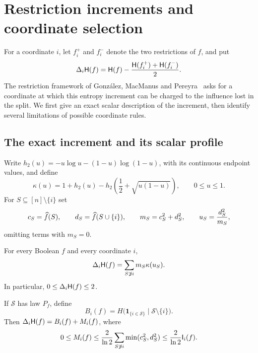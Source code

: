 \section{Restriction increments and coordinate selection}\label{sec:restrictions}

For a coordinate $i$, let $f_i^+$ and $f_i^-$ denote the two restrictions
of $f$, and put
\[
 \Delta_i\mathsf H(f)=\mathsf H(f)-\frac{\mathsf H(f_i^+)+\mathsf H(f_i^-)}2.
\]
The restriction framework of Gonz\'alez, MacManus and
Pereyra~\cite{GMP26} asks for a coordinate at which this entropy
increment can be charged to the influence lost in the split.
We first give an exact scalar description of the increment, then
identify several limitations of possible coordinate rules.

\subsection{The exact increment and its scalar profile}

Write $h_2(u)=-u\log u-(1-u)\log(1-u)$, with its continuous endpoint
values, and define
\begin{equation}\label{eq:kappadef}
 \kappa(u)=1+h_2(u)
 -h_2\!\left(\frac12+\sqrt{u(1-u)}\right),
 \qquad 0\le u\le1.
\end{equation}
For $S\subseteq[n]\setminus\{i\}$ set
\[
 c_S=\widehat{f}(S),\qquad d_S=\widehat{f}(S\cup\{i\}),\qquad
 m_S=c_S^2+d_S^2,\qquad u_S=\frac{d_S^2}{m_S},
\]
omitting terms with $m_S=0$.

\begin{proposition}\label{prop:splitexact}
For every Boolean $f$ and every coordinate $i$,
\begin{equation}\label{eq:splitexact}
 \Delta_i\mathsf H(f)=\sum_{S\not\ni i}m_S\kappa(u_S).
\end{equation}
In particular, $0\le\Delta_i\mathsf H(f)\le2$.

If $\mathcal S$ has law $P_f$, define
\[
 B_i(f)=H\bigl(\mathbf1_{\{i\in\mathcal S\}}\mid
                         \mathcal S\setminus\{i\}\bigr).
\]
Then $\Delta_i\mathsf H(f)=B_i(f)+M_i(f)$, where
\begin{equation}\label{eq:mixingbound}
 0\le M_i(f)\le
 \frac2{\ln2}\sum_{S\not\ni i}\min(c_S^2,d_S^2)
 \le\frac2{\ln2}\mathsf I_i(f).
\end{equation}
\end{proposition}

